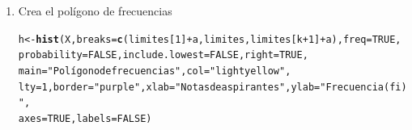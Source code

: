 \documentclass[12pt,letterpaper]{article}\usepackage[]{graphicx}\usepackage[]{color}
\makeatletter
\newcommand{\hlnum}[1]{\textcolor[rgb]{0.686,0.059,0.569}{#1}}%
\newcommand{\hlstr}[1]{\textcolor[rgb]{0.192,0.494,0.8}{#1}}%
\newcommand{\hlopt}[1]{\textcolor[rgb]{0,0,0}{#1}}%
\newcommand{\hlstd}[1]{\textcolor[rgb]{0.345,0.345,0.345}{#1}}%
\newcommand{\hlkwb}[1]{\textcolor[rgb]{0.69,0.353,0.396}{#1}}%
\newcommand{\hlkwc}[1]{\textcolor[rgb]{0.333,0.667,0.333}{#1}}%
\newcommand{\hlkwd}[1]{\textcolor[rgb]{0.737,0.353,0.396}{\textbf{#1}}}%
\newenvironment{kframe}{%
 \def\at@end@of@kframe{}%
 \ifinner\ifhmode%
  \def\at@end@of@kframe{\end{minipage}}%
  \begin{minipage}{\columnwidth}%
 \fi\fi%
 \def\FrameCommand##1{\hskip\@totalleftmargin \hskip-\fboxsep
 \colorbox{shadecolor}{##1}\hskip-\fboxsep
     \hskip-\linewidth \hskip-\@totalleftmargin \hskip\columnwidth}%
 \MakeFramed {\advance\hsize-\width
   \@totalleftmargin\z@ \linewidth\hsize
   \@setminipage}}%
 {\par\unskip\endMakeFramed%
 \at@end@of@kframe}
\newenvironment{knitrout}{}{} %
\makeatother
\begin{document}
\begin{enumerate}
\item Crea el pol\'igono de frecuencias
\begin{knitrout}
\color{fgcolor}\begin{kframe}
\begin{alltt}
\hlstd{h}\hlkwb{<-} \hlkwd{hist}\hlstd{(X,} \hlkwc{breaks}\hlstd{=}\hlkwd{c}\hlstd{(limites[}\hlnum{1}\hlstd{]}\hlopt{+}\hlstd{a, limites, limites[k}\hlopt{+}\hlnum{1}\hlstd{]}\hlopt{+}\hlstd{a),} \hlkwc{freq} \hlstd{=}\hlnum{TRUE}\hlstd{,}
          \hlkwc{probability}\hlstd{=}\hlnum{FALSE} \hlstd{,} \hlkwc{include.lowest}\hlstd{=}\hlnum{FALSE} \hlstd{,} \hlkwc{right}\hlstd{=}\hlnum{TRUE}\hlstd{,}
\hlkwc{main} \hlstd{=} \hlstr{"Polígono de frecuencias"}\hlstd{,}\hlkwc{col}\hlstd{=}\hlstr{"lightyellow"}\hlstd{,}
\hlkwc{lty}\hlstd{=}\hlnum{1}\hlstd{,} \hlkwc{border} \hlstd{=} \hlstr{"purple"} \hlstd{,} \hlkwc{xlab}\hlstd{=}\hlstr{" Notas de aspirantes"} \hlstd{,} \hlkwc{ylab}\hlstd{=}\hlstr{"Frecuencia (fi)"}\hlstd{,}
\hlkwc{axes}\hlstd{=}\hlnum{TRUE}\hlstd{,} \hlkwc{labels}\hlstd{=}\hlnum{FALSE}\hlstd{)}
\end{alltt}



\end{kframe}
\end{knitrout}
\end{enumerate}
\end{document}
